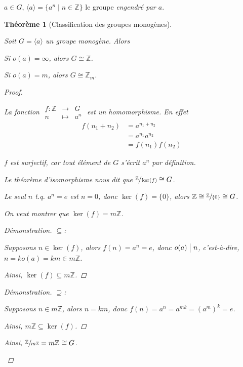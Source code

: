 \documentclass{report}
\newcommand*{\entiers}{\mathbb{Z}}
\newtheorem*{thm}{Th\'eor\`eme}
\theoremstyle{definition}
\theoremstyle{remark}
\newenvironment*{subproof}[1][D\'emonstration]
{
\begin{proof}[#1]

}
{
	\renewcommand{\qedsymbol}{$\blacksquare$}
\end{proof}
\renewcommand{\qedsymbol}{$\square$}
}
\begin{document}
	$a \in G$, $\langle a \rangle = \{a^n \mid n \in \entiers\}$ le groupe \emph{engendr\'e par $a$}.
	\begin{thm}[Classification des groupes monog\`enes]~

		Soit $G = \langle a \rangle$ un groupe monog\`ene. Alors
		\begin{nlist}
			\item Si $o(a)=\infty$, alors $G \cong \entiers$.
			\item Si $o(a)=m$, alors $G \cong \entiers_m$.
		\end{nlist}
		\begin{proof}~

			La fonction $\begin{array}{rcl}
				f:\entiers&\to&G\\
				n&\mapsto&a^n
			\end{array}$ est un homomorphisme. En effet
			\begin{align*}
				f(n_1+n_2)&= a^{n_1+n_2}\\
				&= a^{n_1}a^{n_2}\\
				&= f(n_1)f(n_2)
			\end{align*}

			$f$ est surjectif, car tout \'el\'ement de $G$ s'\'ecrit $a^n$ par d\'efinition.

			Le th\'eor\`eme d'isomorphisme nous dit que $\sfrac{\entiers}{\ker(f)} \cong G$.
			\begin{nlist}
				\item Le seul $n$ t.q. $a^n=e$ est $n=0$, donc $\ker(f)=\{0\}$, alors $\entiers \cong \sfrac{\entiers}{\{0\}} \cong G$.
				\item On veut montrer que $\ker(f)=m\entiers$.
				\begin{subproof}{$\subseteq$:}~

					Supposons $n \in \ker(f)$, alors $f(n) = a^n = e$, donc $o(a) \bigm| n$, c'est-\`a-dire, $n = ko(a) = km \in m\entiers$.

					Ainsi, $\ker(f) \subseteq m\entiers$.
				\end{subproof}
				\begin{subproof}{$\supseteq$:}~

					Supposons $n \in m\entiers$, alors $n=km$, donc $f(n) = a^n = a^{mk} = (a^m)^k = e$.

					Ainsi, $m\entiers \subseteq \ker(f)$.
				\end{subproof}

				Ainsi, $\sfrac{\entiers}{m\entiers} = m\entiers \cong G$.
			\end{nlist}
		\end{proof}
	\end{thm}
\end{document}
